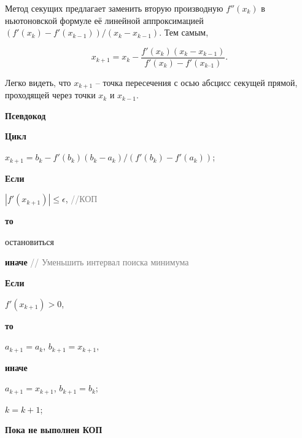 \documentclass[a4paper,12pt]{article}
\begin{document}
Метод секущих предлагает заменить вторую производную 
$f''(x_k)$ в ньютоновской формуле её линейной аппроксимацией $(f'(x_k) - f'(x_{k - 1}))/(x_{k} - x_{k - 1})$. Тем самым,

\begin{equation*}
x_{k + 1} = x_k - \frac{f'(x_k)(x_k - x_{k - 1})}{f'(x_k) - f '(x_{k – 1})}.
\end{equation*}

Легко видеть, что $x_{k + 1}$ -- точка пересечения с осью абсцисс секущей прямой, проходящей через точки $x_{k}$ и $x_{k - 1}$.

\textbf{Псевдокод}

\textbf{Цикл} 

$x_{k + 1} = b_{k} - f'(b_k)(b_k - a_k)/(f'(b_k) - f'(a_k))$; 

\textbf{Если}

\quad $|f'(x_{k + 1})| \leq \epsilon$, \textcolor{gray}{//КОП}

\textbf{то}

\quad остановиться

\textbf{иначе} \textcolor{gray}{// Уменьшить интервал поиска минимума}


\quad \textbf{Если}

\quad\quad $ f'(x_{k + 1}) > 0$, 

\quad \textbf{то}

\quad\quad$a_{k + 1} = a_k$, $b_{k + 1} = x_{k + 1},$ 

\quad\textbf{иначе}


\quad\quad$a_{k + 1} = x_{k + 1}$, $b_{k + 1} = b_k$;


$k = k + 1$;


\textbf{Пока не выполнен КОП}
\end{document}
